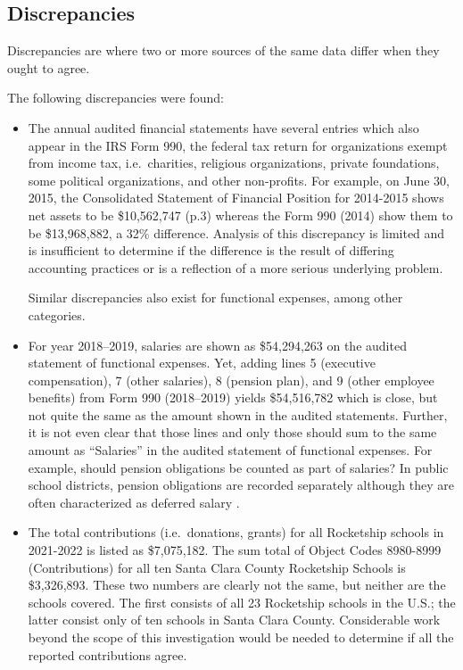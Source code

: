 \subsection{Discrepancies}%
\label{sec:discrepancies}\indent%

Discrepancies are where two or more sources of the same data differ when they ought to agree.

The following discrepancies were found:
\begin{itemize}
  \item The annual audited financial statements have several entries which also appear in the IRS Form 990, the federal tax return for organizations exempt from income tax, i.e.\ charities, religious organizations, private foundations, some political organizations, and other non-profits. For example, on June 30, 2015, the Consolidated Statement of Financial Position for 2014-2015 shows net assets to be \$10,562,747 (p.3) whereas the Form 990 (2014) show them to be \$13,968,882, a 32\% difference. Analysis of this discrepancy is limited and is insufficient to determine if the difference is the result of differing accounting practices or is a reflection of a more serious underlying problem.

  Similar discrepancies also exist for functional expenses, among other categories.
 \item For year 2018–2019, salaries are shown as \$54,294,263 on the audited statement of functional expenses. Yet, adding lines 5 (executive compensation), 7 (other salaries), 8 (pension plan), and 9 (other employee benefits) from Form 990 (2018–2019) yields \$54,516,782 which is close, but not quite the same as the amount shown in the audited statements. Further, it is not even clear that those lines and only those should sum to the same amount as ``Salaries'' in the audited statement of functional expenses.  For example, should pension obligations be counted as part of salaries? In public school districts, pension obligations are recorded separately although they are often characterized as deferred salary \parencite{Kagan2022}. 

  \item The total contributions (i.e.\ donations, grants) for all Rocketship schools in 2021-2022 is listed as \$7,075,182. The sum total of Object Codes 8980-8999 (Contributions) for all ten Santa Clara County Rocketship Schools is \$3,326,893. These two numbers are clearly not the same, but neither are the schools covered. The first consists of all 23 Rocketship schools in the U.S.; the latter consist only of ten schools in Santa Clara County. Considerable work beyond the scope of this investigation would be needed to determine if all the reported contributions agree.


\end{itemize}

